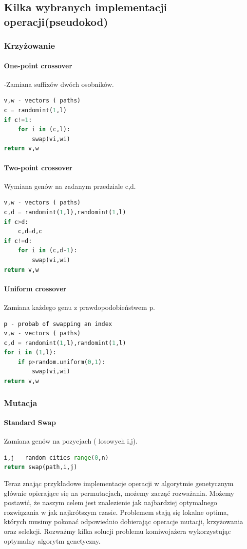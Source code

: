 \documentclass[11pt]{article}
\begin{document}
\subsection{Kilka wybranych implementacji operacji(pseudokod)}
\subsubsection{Krzyżowanie}
\paragraph{One-point crossover}-Zamiana suffixów dwóch osobników.
\begin{lstlisting}[language=Python ]
v,w - vectors ( paths)
c = randomint(1,l)
if c!=1:
	for i in (c,l):
		swap(vi,wi)
return v,w
\end{lstlisting}
\paragraph{Two-point crossover}Wymiana genów na zadanym przedziale c,d.
\begin{lstlisting}[language=Python]
v,w - vectors ( paths)
c,d = randomint(1,l),randomint(1,l)
if c>d:
	c,d=d,c
if c!=d:
	for i in (c,d-1):
		swap(vi,wi)
return v,w
\end{lstlisting}
\paragraph{Uniform crossover}Zamiana każdego genu z prawdopodobieństwem p.
\begin{lstlisting}[language=Python]
p - probab of swapping an index
v,w - vectors ( paths)
c,d = randomint(1,l),randomint(1,l)
for i in (1,l):
	if p>random.uniform(0,1):
		swap(vi,wi)
return v,w
\end{lstlisting}
\subsubsection{Mutacja}
\paragraph{Standard Swap} Zamiana genów na pozycjach ( losowych i,j).
\begin{lstlisting}[language=Python]
i,j - random cities range(0,n)
return swap(path,i,j)
\end{lstlisting}
Teraz znając przykładowe implementacje operacji w algorytmie genetycznym głównie opierające się na permutacjach, możemy zacząć rozważania. Możemy postawić, że naszym celem jest znalezienie jak najbardziej optymalnego rozwiązania w jak najkrótszym czasie. Problemem stają się lokalne optima, których musimy pokonać odpowiednio dobierając operacje mutacji, krzyżowania oraz selekcji. Rozważmy kilka solucji problemu komiwojażera wykorzystując optymalny algorytm genetyczny.
\end{document}
